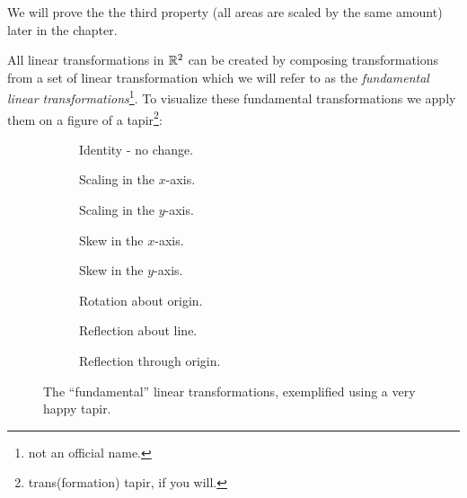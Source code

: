 We will prove the the third property (all areas are scaled by the same amount) later in the chapter.

All linear transformations in $\mathbb{R}^{2}$ can be created by composing transformations from a set of linear transformation which we will refer to as the \emph{fundamental linear transformations}\footnote{not an official name.}. To visualize these fundamental transformations we apply them on a figure of a tapir\footnote{trans(formation) tapir, if you will.}:

\begin{figure}[H]
	\centering
\end{figure}

\begin{figure}
	\centering
	\begin{subfigure}[c]{0.29\textwidth}
		\centering
		\caption{Identity - no change.}
		\label{fig:}
	\end{subfigure}
	\begin{subfigure}[c]{0.37\textwidth}
		\centering
		\caption{Scaling in the $x$-axis.}
		\label{fig:}
	\end{subfigure}
	\begin{subfigure}[c]{0.29\textwidth}
		\centering
		\caption{Scaling in the $y$-axis.}
		\label{fig:}
	\end{subfigure}
	\hfill
	\begin{subfigure}[c]{0.3\textwidth}
		\centering
		\caption{Skew in the $x$-axis.}
		\label{fig:}
	\end{subfigure}
	\begin{subfigure}[c]{0.3\textwidth}
		\centering
		\caption{Skew in the $y$-axis.}
		\label{fig:}
	\end{subfigure}
	\begin{subfigure}[c]{0.35\textwidth}
		\centering
		\caption{Rotation about origin.}
		\label{fig:}
	\end{subfigure}
	\hfill
	\begin{subfigure}[c]{0.3\textwidth}
		\centering
		\caption{Reflection about line.}
		\label{fig:}
	\end{subfigure}
	\begin{subfigure}[c]{0.3\textwidth}
		\centering
		\caption{Reflection through origin.}
		\label{fig:}
	\end{subfigure}
	\caption{The ``fundamental'' linear transformations, exemplified using a very happy tapir.}
	\label{fig:fundLinearTrans}
\end{figure}

\Blindtext
